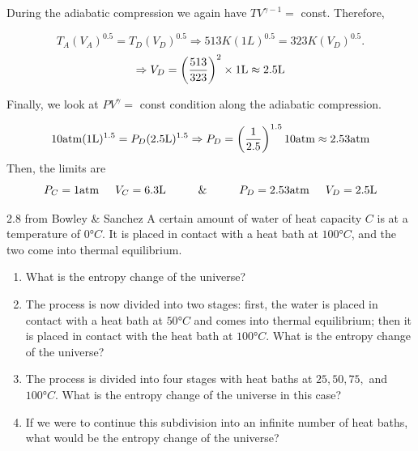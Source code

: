         During the adiabatic compression we again have $TV^{\gamma-1}=$ const. Therefore,
        
        \begin{equation}
            T_A(V_A)^{0.5} = T_D(V_D)^{0.5} \Rightarrow 513\si{K}(1\si{L})^{0.5} = 323\si{K}(V_D)^{0.5}.
        \end{equation}
        \begin{equation}
             \Rightarrow V_D = \lrp{\frac{513}{323}}^2\times 1\si{L} \approx 2.5\si{L}
        \end{equation}
        
        Finally, we look at $PV^\gamma=$ const condition along the adiabatic compression.
        
        \begin{equation}
            10\si{atm}(1\si{L})^{1.5} = P_D(2.5\si{L})^{1.5} \Rightarrow P_D = \lrp{\frac{1}{2.5}}^{1.5}10\si{atm} \approx 2.53\si{atm}
        \end{equation}
        Then, the limits are
        \begin{equation}
            P_C = 1\si{atm} \hspace{0.5cm} V_C = 6.3\si{L} \hspace{1cm}\&\hspace{1cm} P_D = 2.53\si{atm} \hspace{0.5cm} V_D = 2.5\si{L}
        \end{equation}

    \begin{eocproblem*}{2.8 from Bowley \& Sanchez}
        A certain amount of water of heat capacity $C$ is at a temperature of $0\si{\degree C}$. It is placed in contact with a heat bath at $100\si{\degree C}$, and the two come into thermal equilibrium.
        \begin{enumerate}[label = (\alph*)]
            \item What is the entropy change of the universe?
            \item The process is now divided into two stages: first, the water is placed in contact with a heat bath at $50\si{\degree C}$ and comes into thermal equilibrium; then it is placed in contact with the heat bath at $100\si{\degree C}$. What is the entropy change of the universe?
            \item The process is divided into four stages with heat baths at $25,50,75,$ and $100\si{\degree C}$. What is the entropy change of the universe in this case?
            \item If we were to continue this subdivision into an infinite number of heat baths, what would be the entropy change of the universe?
        \end{enumerate}
    \end{eocproblem*}
    
